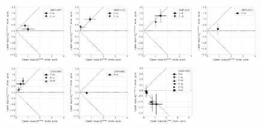 \begin{figure}
 \includegraphics[width=0.24\textwidth]{rel_vs_astrom/0445+097}
 \includegraphics[width=0.24\textwidth]{rel_vs_astrom/0446+113}
 \includegraphics[width=0.24\textwidth]{rel_vs_astrom/0447-010}
 \includegraphics[width=0.24\textwidth]{rel_vs_astrom/0450+013}
 \includegraphics[width=0.24\textwidth]{rel_vs_astrom/1745+085}
 \includegraphics[width=0.24\textwidth]{rel_vs_astrom/1749+062}
 \includegraphics[width=0.24\textwidth]{rel_vs_astrom/2144+092}

\end{figure}
